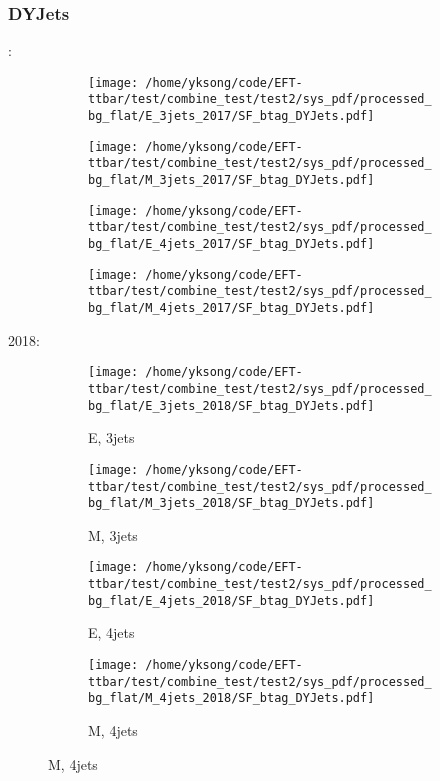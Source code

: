 \documentclass{beamer}
\begin{document}
\begin{frame}
\frametitle{DYJets}
\fontsize{5}{1}:
\begin{figure}
\centering
\begin{subfigure}[b]{0.24\textwidth}
\texttt{[image: /home/yksong/code/EFT-ttbar/test/combine\_test/test2/sys\_pdf/processed\_bg\_flat/E\_3jets\_2017/SF\_btag\_DYJets.pdf]}
\end{subfigure}
\begin{subfigure}[b]{0.24\textwidth}
\texttt{[image: /home/yksong/code/EFT-ttbar/test/combine\_test/test2/sys\_pdf/processed\_bg\_flat/M\_3jets\_2017/SF\_btag\_DYJets.pdf]}
\end{subfigure}
\begin{subfigure}[b]{0.24\textwidth}
\texttt{[image: /home/yksong/code/EFT-ttbar/test/combine\_test/test2/sys\_pdf/processed\_bg\_flat/E\_4jets\_2017/SF\_btag\_DYJets.pdf]}
\end{subfigure}
\begin{subfigure}[b]{0.24\textwidth}
\texttt{[image: /home/yksong/code/EFT-ttbar/test/combine\_test/test2/sys\_pdf/processed\_bg\_flat/M\_4jets\_2017/SF\_btag\_DYJets.pdf]}
\end{subfigure}
\end{figure}
2018:
\begin{figure}
\centering
\begin{subfigure}[b]{0.24\textwidth}
\texttt{[image: /home/yksong/code/EFT-ttbar/test/combine\_test/test2/sys\_pdf/processed\_bg\_flat/E\_3jets\_2018/SF\_btag\_DYJets.pdf]}
\captionsetup{font=tiny}
\caption{E, 3jets}
\end{subfigure}
\begin{subfigure}[b]{0.24\textwidth}
\texttt{[image: /home/yksong/code/EFT-ttbar/test/combine\_test/test2/sys\_pdf/processed\_bg\_flat/M\_3jets\_2018/SF\_btag\_DYJets.pdf]}
\captionsetup{font=tiny}
\caption{M, 3jets}
\end{subfigure}
\begin{subfigure}[b]{0.24\textwidth}
\texttt{[image: /home/yksong/code/EFT-ttbar/test/combine\_test/test2/sys\_pdf/processed\_bg\_flat/E\_4jets\_2018/SF\_btag\_DYJets.pdf]}
\captionsetup{font=tiny}
\caption{E, 4jets}
\end{subfigure}
\begin{subfigure}[b]{0.24\textwidth}
\texttt{[image: /home/yksong/code/EFT-ttbar/test/combine\_test/test2/sys\_pdf/processed\_bg\_flat/M\_4jets\_2018/SF\_btag\_DYJets.pdf]}
\captionsetup{font=tiny}
\caption{M, 4jets}
\end{subfigure}
\end{figure}
\end{frame}
\end{document}
